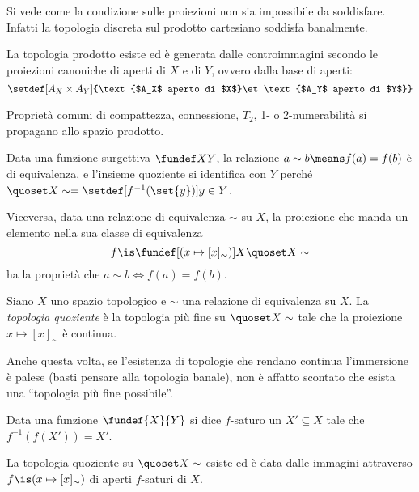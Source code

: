 \begin{oss}
	Si vede come la condizione sulle proiezioni non sia impossibile da soddisfare. Infatti la topologia discreta sul prodotto cartesiano soddisfa banalmente.
\end{oss}

\begin{fat}
	La topologia prodotto esiste ed è generata dalle controimmagini secondo le proiezioni canoniche di aperti di $X$ e di $Y$,
	ovvero dalla base di aperti:
	\[\setdef[A_X\times A_Y]{\text{$A_X$ aperto di $X$}\et\text{$A_Y$ aperto di $Y$}}\]
\end{fat}

\begin{fat}
	Proprietà comuni di compattezza, connessione, $T_2$, 1- o 2-numerabilità si propagano allo spazio prodotto.
\end{fat}

\begin{oss}
	Data una funzione surgettiva $\fundef XY$, la relazione $a\sim b\means f(a)=f(b)$ è di equivalenza, e l'insieme quoziente si identifica con $Y$ perché $\quoset X\sim=\setdef[f^{-1}(\set{y})]{y\in Y}$.
	
	Viceversa, data una relazione di equivalenza $\sim$ su $X$, la proiezione che manda un elemento nella sua classe di equivalenza
	\[f\is\fundef[{(x\mapsto [x]_\sim)}]X{\quoset X\sim}\]
	ha la proprietà che $a\sim b\iff f(a)=f(b)$.
\end{oss}

\begin{defn}
	Siano $X$ uno spazio topologico e $\sim$ una relazione di equivalenza su $X$.
	La \emph{topologia quoziente} è la topologia più fine su $\quoset X\sim$ tale che la proiezione $x\mapsto[x]_\sim$ è continua.
\end{defn}

\begin{oss}
	Anche questa volta, se l'esistenza di topologie che rendano continua l'immersione è palese (basti pensare alla topologia banale), non è affatto scontato che esista una ``topologia più fine possibile''.
\end{oss}

\begin{defn}
	Data una funzione $\fundef{X}{Y}$ si dice $f$-saturo un $X'\subseteq X$ tale che $f^{-1}(f(X'))=X'$.
\end{defn}

\begin{fat}
	La topologia quoziente su $\quoset X\sim$ esiste ed è data dalle immagini attraverso $f\is(x\mapsto[x]_\sim)$ di aperti $f$-saturi di $X$.
\end{fat}

